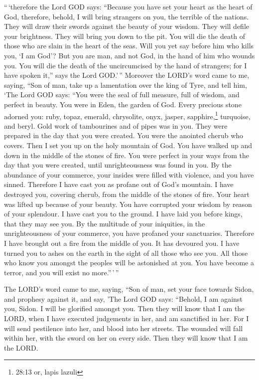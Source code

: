  ``\,`therefore the Lord GOD says: ``Because you have set
your heart as the heart of God,  therefore, behold, I will
bring strangers on you, the terrible of the nations. They will draw
their swords against the beauty of your wisdom. They will defile your
brightness.  They will bring you down to the pit. You will
die the death of those who are slain in the heart of the seas.
 Will you yet say before him who kills you, `I am God'? But
you are man, and not God, in the hand of him who wounds you.
 You will die the death of the uncircumcised by the hand of
strangers; for I have spoken it,'' says the Lord GOD.'\,'' 
Moreover the LORD's word came to me, saying,  ``Son of man,
take up a lamentation over the king of Tyre, and tell him, `The Lord GOD
says: ``You were the seal of full measure, full of wisdom, and perfect
in beauty.  You were in Eden, the garden of God. Every
precious stone adorned you: ruby, topaz, emerald, chrysolite, onyx,
jasper, sapphire,\footnote{28:13 or, lapis lazuli} turquoise, and beryl.
Gold work of tambourines and of pipes was in you. They were prepared in
the day that you were created.  You were the anointed
cherub who covers. Then I set you up on the holy mountain of God. You
have walked up and down in the middle of the stones of fire.
 You were perfect in your ways from the day that you were
created, until unrighteousness was found in you.  By the
abundance of your commerce, your insides were filled with violence, and
you have sinned. Therefore I have cast you as profane out of God's
mountain. I have destroyed you, covering cherub, from the middle of the
stones of fire.  Your heart was lifted up because of your
beauty. You have corrupted your wisdom by reason of your splendour. I
have cast you to the ground. I have laid you before kings, that they may
see you.  By the multitude of your iniquities, in the
unrighteousness of your commerce, you have profaned your sanctuaries.
Therefore I have brought out a fire from the middle of you. It has
devoured you. I have turned you to ashes on the earth in the sight of
all those who see you.  All those who know you amongst the
peoples will be astonished at you. You have become a terror, and you
will exist no more.''\,'\,''

 The LORD's word came to me, saying,  ``Son of
man, set your face towards Sidon, and prophesy against it, 
and say, 'The Lord GOD says: ``Behold, I am against you, Sidon. I will
be glorified amongst you. Then they will know that I am the LORD, when I
have executed judgements in her, and am sanctified in her. 
For I will send pestilence into her, and blood into her streets. The
wounded will fall within her, with the sword on her on every side. Then
they will know that I am the LORD.

